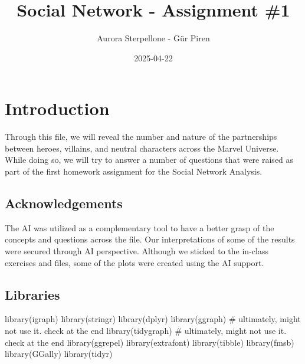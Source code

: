 \documentclass[
  letterpaper,
  DIV=11,
  numbers=noendperiod]{scrartcl}
\title{Social Network - Assignment \#1}
\author{Aurora Sterpellone - Gür Piren}
\date{2025-04-22}
\newenvironment{Shaded}{\begin{snugshade}}{\end{snugshade}}
\newcommand{\CommentTok}[1]{\textcolor[rgb]{0.37,0.37,0.37}{#1}}
\newcommand{\FunctionTok}[1]{\textcolor[rgb]{0.28,0.35,0.67}{#1}}
\newcommand{\NormalTok}[1]{\textcolor[rgb]{0.00,0.23,0.31}{#1}}
\renewcommand*\contentsname{Table of contents}
\newcommand\contentsname{Table of contents}
\begin{document}
\maketitle

\renewcommand*\contentsname{Table of contents}
{
\hypersetup{linkcolor=}
\setcounter{tocdepth}{3}
\tableofcontents
}

\section{Introduction}\label{introduction}

Through this file, we will reveal the number and nature of the
partnerships between heroes, villains, and neutral characters across the
Marvel Universe. While doing so, we will try to answer a number of
questions that were raised as part of the first homework assignment for
the Social Network Analysis.

\subsection{Acknowledgements}\label{acknowledgements}

The AI was utilized as a complementary tool to have a better grasp of
the concepts and questions across the file. Our interpretations of some
of the results were secured through AI perspective. Although we sticked
to the in-class exercises and files, some of the plots were created
using the AI support.

\subsection{Libraries}\label{libraries}

\begin{Shaded}
\begin{Highlighting}[]
\FunctionTok{library}\NormalTok{(igraph)}
\FunctionTok{library}\NormalTok{(stringr)}
\FunctionTok{library}\NormalTok{(dplyr)}
\FunctionTok{library}\NormalTok{(ggraph) }\CommentTok{\# ultimately, might not use it. check at the end}
\FunctionTok{library}\NormalTok{(tidygraph) }\CommentTok{\# ultimately, might not use it. check at the end}
\FunctionTok{library}\NormalTok{(ggrepel)}
\FunctionTok{library}\NormalTok{(extrafont)}
\FunctionTok{library}\NormalTok{(tibble)}
\FunctionTok{library}\NormalTok{(fmsb)}
\FunctionTok{library}\NormalTok{(GGally)}
\FunctionTok{library}\NormalTok{(tidyr)}
\end{Highlighting}
\end{Shaded}
\end{document}
